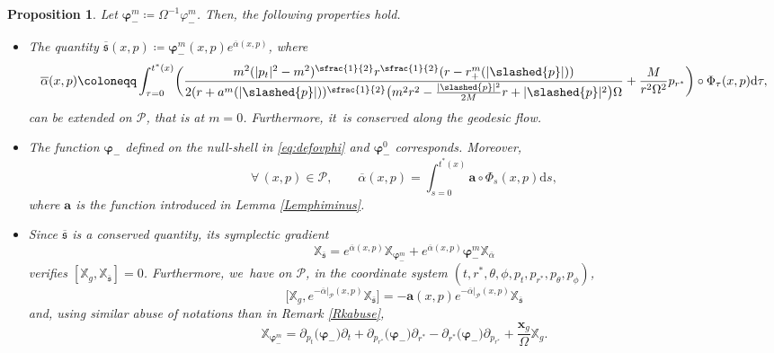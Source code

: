 \documentclass[JEP,XML,SOM,Unicode,published]{cedram}
\theoremstyle{plain}
\newtheorem{proposition}{Proposition}[section]
\theoremstyle{definition}
\newcommand\T{{\mathbb{X}}}
\newcommand\dr{{\mathrm{d}}}
\begin{document}
\begin{proposition}
Let $\pmb{\varphi}_-^m\coloneqq \Omega^{-1} \varphi_-^m$. Then, the following properties hold.
\begin{itemize}
\item The quantity $\overline{\mathfrak{s}} (x,p) \coloneqq \pmb{\varphi}_-^m (x,p) e^{\overline{\alpha} (x,p)}$, where
\[
\overline{\alpha}(x,p)\coloneqq \int_{\tau=0}^{t^*(x)} \biggl(\frac{m^2(|p_t|^2-m^2)^{\sfrac{1}{2}}r^{\sfrac{1}{2}}(r-r^{m}_+(|\slashed{p}|))}{2(r+a^{m}(|\slashed{p}|))^{\sfrac{1}{2}}\bigl(m^2 r^2-\frac{|\slashed{p}|^2}{2M}r+|\slashed{p}|^2\bigr)\Omega}+ \frac{M}{r^2 \Omega^2}p_{r^*} \biggr) \circ \Phi_{\tau}(x,p) \dr \tau,
\]
can be extended on $\mathcal{P}$, that is at $m=0$. Furthermore, it~is conserved along the geodesic flow.
\item The function $\pmb{\varphi}_-$ defined on the null-shell in \eqref{eq:defovphi} and $\pmb{\varphi}_-^0$ corresponds. Moreover,
\[
\forall \, (x,p) \in \mathcal{P}, \qquad \overline{\alpha} (x,p)= \int_{s=0}^{t^*(x)} \pmb{a} \circ \Phi_{s}(x,p) \dr s,
\]
where $\pmb{a}$ is the function introduced in Lemma \ref{Lemphiminus}.
\item Since $\overline{\mathfrak{s}}$ is a conserved quantity, its symplectic gradient
\[\T_{\overline{\mathfrak{s}}}=e^{\overline{\alpha} (x,p)}\T_{\pmb{\varphi}_-^m}+ e^{\overline{\alpha} (x,p)}\pmb{\varphi}_-^m\T_{\overline{\alpha}}\]
verifies $[\T_g, \T_{\overline{\mathfrak{s}}}]=0$. Furthermore, we~have on $\mathcal{P}$, in the coordinate system $(t,r^*,\theta, \phi, p_t,p_{r^*},p_\theta, p_\phi)$,
\[
\bigl[\T_g, e^{-\overline{\alpha}\vert_{\mathcal{P}}(x,p)} \T_{\overline{\mathfrak{s}}} \bigr] = -\pmb{a}(x,p) e^{-\overline{\alpha}\vert_{\mathcal{P}}(x,p)}\T_{\overline{\mathfrak{s}}}
\]
and, using similar abuse of notations than in Remark \ref{Rkabuse},
\[
\T_{\pmb{\varphi}_-^m} = \partial_{p_t} \bigl(\pmb{\varphi}_- \bigr)\partial_t+\partial_{p_{r^*}} \bigl(\pmb{\varphi}_- \bigr) \partial_{r^*}-\partial_{r^*}\bigl(\pmb{\varphi}_- \bigr) \partial_{p_{r^*}}+\frac{\pmb{x}_g}{\Omega} \T_g.
\]
\end{itemize}
\end{proposition}
\end{document}
